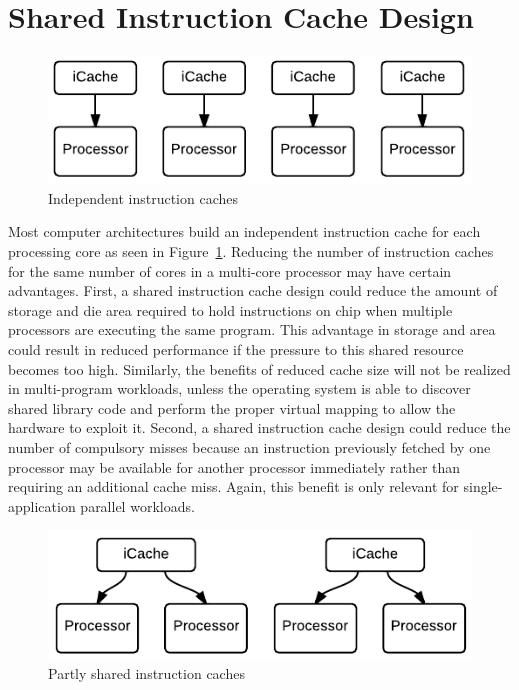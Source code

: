 \section{Shared Instruction Cache Design}


\begin{figure}
\centering
\includegraphics[width=\columnwidth]{graphics/IndependentCaches}
\caption{Independent instruction caches}
\label{fig:indep}
\end{figure}

Most computer architectures build an independent instruction cache for
each processing core as seen in Figure~\ref{fig:indep}.
Reducing the number of instruction caches for the same number of cores
in a multi-core processor may have certain advantages. 
First, a shared instruction cache design could reduce the amount of
storage and die area required to hold instructions on chip when
multiple processors are executing the same program.
This advantage in storage and area could result in reduced performance
if the pressure to this shared resource becomes too high.
Similarly, the benefits of reduced cache size will not be realized in
multi-program workloads, unless the operating system is able to
discover shared library code and perform the proper virtual mapping to
allow the hardware to exploit it.
Second, a shared instruction cache design could reduce the number of
compulsory misses because an instruction previously fetched
by one processor may be available for another processor immediately
rather than requiring an additional cache miss. 
Again, this benefit is only relevant for single-application parallel
workloads. 

\begin{figure}
\centering
\includegraphics[width=\columnwidth]{graphics/PairedCaches}
\caption{Partly shared instruction caches}
\label{fig:paired}
\end{figure}

